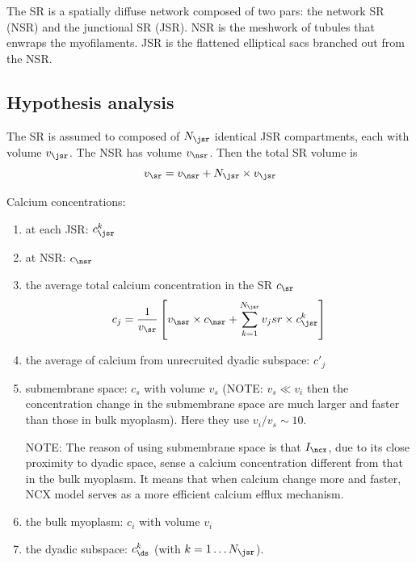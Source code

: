 The SR is a spatially diffuse network composed of two pars:
the network SR (NSR) and the junctional SR (JSR). NSR is the meshwork of tubules
that enwraps the myofilaments. JSR is the flattened elliptical sacs branched out
from the NSR.

\subsection{Hypothesis analysis}
\label{sec:shiferaw2003_hyp_anal}

The SR is assumed to composed of $N_\jsr$ identical JSR compartments, each with
volume $v_\jsr$. The NSR has volume $v_\nsr$. Then the total SR volume is
\begin{equation}
\label{eq:shiferaw2003_1}
v_\sr = v_\nsr + N_\jsr \times v_\jsr
\end{equation}

Calcium concentrations:
\begin{enumerate}
  \item at each JSR: $c^k_\jsr$
  \item at NSR: $c_\nsr$
  \item the average total calcium concentration in the SR $c_\sr$
  \begin{equation}
  \label{eq:shiferaw2003_2}
  c_j = \frac{1}{v_\sr}\left[ v_\nsr\times c_\nsr +
  \sum^{N_\jsr}_{k=1} v_jsr\times c^k_\jsr \right]
  \end{equation}
  \item the average of calcium from unrecruited dyadic subspace: $c'_j$

  \item submembrane space: $c_s$ with volume $v_s$ (NOTE: $v_s \ll v_i$ then
  the concentration change in the submembrane space are much larger and faster
  than those in bulk myoplasm). Here they use $v_i/v_s \sim 10$.

  NOTE: The reason of using submembrane space is that $I_\ncx$, due to its close
  proximity to dyadic space, sense a calcium concentration different from that
  in the bulk myoplasm. It means that when calcium change more and faster, NCX
  model serves as a more efficient calcium efflux mechanism.

  \item the bulk myoplasm: $c_i$ with volume $v_i$

  \item the dyadic subspace: $c^k_\ds$ (with $k=1\ldots N_\jsr$).
\end{enumerate}


